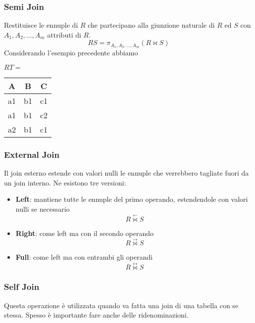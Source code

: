 \subsubsection{Semi Join}
Restituisce le ennuple di $R$ che partecipano alla giunzione naturale di $R$ ed $S$ con $A_1, A_2, \ldots, A_m$ attributi di $R$.
\begin{equation}
	R S = \pi_{A_1, A_2, \ldots, A_m}(R \Join S)
\end{equation}
Considerando l'esempio precedente abbiamo
\begin{table}[!h]
	\centering
	$R T =$\hspace{10pt}
	\begin{tabular}{|c|c|c|}
		\hline
		\textbf{A} & \textbf{B} & \textbf{C} \\
		\hline
		a1 & b1 & c1 \\
		\hline
		a1 & b1 & c2 \\
		\hline
		a2 & b1 & c1 \\
		\hline
	\end{tabular}
\end{table}

\subsubsection{External Join}
Il join esterno estende con valori nulli le ennuple che verrebbero tagliate fuori da un join interno. Ne esistono tre versioni:
\begin{itemize}
	\item \textbf{Left}: mantiene tutte le ennuple del primo operando, estendendole con valori nulli se necessario
	\begin{equation}
		R \overset{\leftarrow}{\Join}S
	\end{equation}
	\item \textbf{Right}: come left ma con il secondo operando
	\begin{equation}
		R \overset{\rightarrow}{\Join} S
	\end{equation}
	\item \textbf{Full}: come left ma con entrambi gli operandi
	\begin{equation}
		R \overset{\leftrightarrow}{\Join} S
	\end{equation}
\end{itemize}

\subsubsection{Self Join}
Questa operazione è utilizzata quando va fatta una join di una tabella con se stessa. Spesso è importante fare anche delle ridenominazioni.

